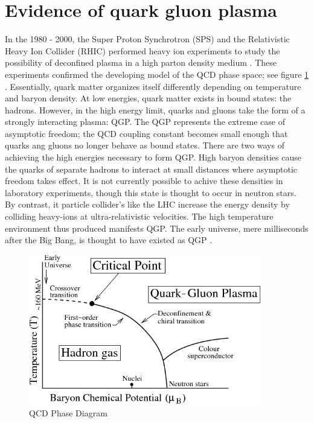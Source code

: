 \section{Evidence of quark gluon plasma}

In the 1980 - 2000, the Super Proton Synchrotron (SPS) and the Relativistic Heavy Ion Collider (RHIC) performed heavy ion experiments to study the possibility of deconfined plasma in a high parton density medium \cite{spsHI}\cite{ags2rhic}\cite{etaOvSinit}. These experiments confirmed the developing model of the QCD phase space; see figure \ref{fig:QCDPhase} \cite{Bhalerao:1695331}. Essentially, quark matter organizes itself differently depending on temperature and baryon density. At low energies, quark matter exists in bound states: the hadrons. However, in the high energy limit, quarks and gluons take the form of a strongly interacting plasma: QGP. The QGP represents the extreme case of asymptotic freedom; the QCD coupling constant becomes small enough that quarks ang gluons no longer behave as bound states. There are two ways of achieving the high energies necessary to form QGP. High baryon densities cause the quarks of separate hadrons to interact at small distances where asymptotic freedom takes effect. It is not currently possible to achive these densities in laboratory experiments, though this state is thought to occur in neutron stars. By contrast, it particle collider's like the LHC increase the energy density by colliding heavy-ions at ultra-relativistic velocities. The high temperature environment thus produced manifests QGP. The early universe, mere milliseconds after the Big Bang, is thought to have existed as QGP \cite{Hands:2001ve}.

\begin{figure}[h!]
\begin{centering}
\includegraphics[width=4in]{Chapter1/importfigs/byr13.png}
\par\end{centering}
\caption{QCD Phase Diagram \cite{Bhalerao:1695331} \label{fig:QCDPhase}}
\end{figure}

